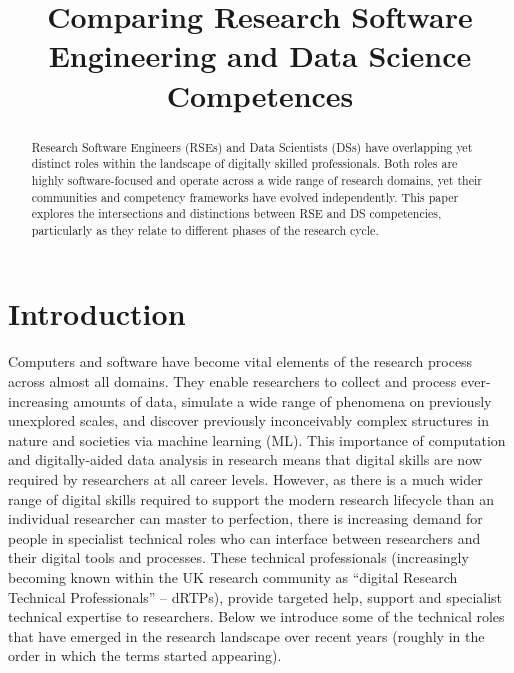 \documentclass[
        english,biblatex
    ]{lni}
\begin{document}
        \title[]{Comparing Research Software Engineering and Data
Science Competences}
    
    

    

    \maketitle

        \begin{abstract}
        Research Software Engineers (RSEs) and Data Scientists (DSs)
        have overlapping yet distinct roles within the landscape of
        digitally skilled professionals. Both roles are highly
        software-focused and operate across a wide range of research
        domains, yet their communities and competency frameworks have
        evolved independently. This paper explores the intersections and
        distinctions between RSE and DS competencies, particularly as
        they relate to different phases of the research cycle.
    \end{abstract}
    
    
    \section{Introduction}\label{introduction}

    Computers and software have become vital elements of the research
    process across almost all domains. They enable researchers to
    collect and process ever-increasing amounts of data, simulate a wide
    range of phenomena on previously unexplored scales, and discover
    previously inconceivably complex structures in nature and societies
    via machine learning (ML). This importance of computation and
    digitally-aided data analysis in research means that digital skills
    are now required by researchers at all career levels. However, as
    there is a much wider range of digital skills required to support
    the modern research lifecycle than an individual researcher can
    master to perfection, there is increasing demand for people in
    specialist technical roles who can interface between researchers and
    their digital tools and processes. These technical professionals
    (increasingly becoming known within the UK research community as
    ``digital Research Technical Professionals'' -- dRTPs), provide
    targeted help, support and specialist technical expertise to
    researchers. Below we introduce some of the technical roles that
    have emerged in the research landscape over recent years (roughly in
    the order in which the terms started appearing).
\end{document}
